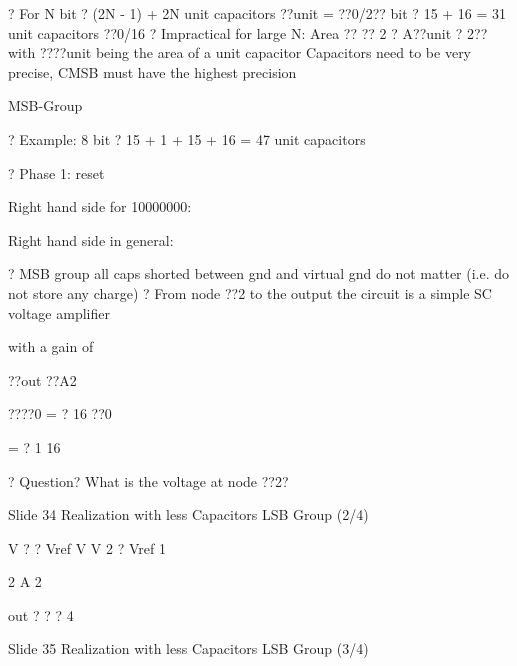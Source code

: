 \documentclass[2pt,landscape]{article}
\begin{document}
\begin{multicols*}{5}
?	For N bit ? (2N - 1) + 2N unit capacitors ??unit = ??0/2??
 bit ? 15 + 16 = 31 unit capacitors ??0/16
?	Impractical for large N:
\textbullet 	Area ?? ?? 2 ? A??unit  ? 2??	with ????unit being the area of a unit capacitor
\textbullet 	Capacitors need to be very precise, CMSB must have the highest precision









MSB-Group



















?	Example: 8 bit ? 15 + 1 + 15 + 16 = 47 unit capacitors



?	Phase 1: reset




Right hand side for 10000000:


Right hand side in general:








?	MSB group all caps shorted between gnd and virtual gnd 
do not matter (i.e. do not store any charge)
?	From node ??2 to the output the circuit is a simple SC voltage amplifier


with a gain of


??out
??A2


????0
= ? 16
??0


= ? 1
16


?	Question? What is the voltage at node ??2?


Slide 34	Realization with less Capacitors \textbullet LSB Group (2/4)







V	? ? Vref	V	V 2    ? Vref	1





2	A	2


out ? ?	?	4


Slide 35	Realization with less Capacitors \textbullet  LSB Group (3/4)






\end{multicols*}
\end{document}
